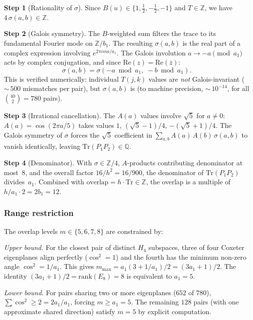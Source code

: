 \documentclass[12pt,a4paper]{article}
\theoremstyle{definition}
\begin{document}
\textbf{Step 1} (Rationality of $\sigma$).  Since $B(u) \in \{1, \tfrac{1}{2}, -\tfrac{1}{2}, -1\}$ and $T \in \mathbb{Z}$, we have $4\,\sigma(a,b) \in \mathbb{Z}$.

\textbf{Step 2} (Galois symmetry).  The $B$-weighted sum filters the trace to its fundamental Fourier mode on $\mathbb{Z}/b_1$.  The resulting $\sigma(a,b)$ is the real part of a complex expression involving $e^{2\pi i m a/a_1}$.  The Galois involution $a \to -a \pmod{a_1}$ acts by complex conjugation, and since $\mathrm{Re}(z) = \mathrm{Re}(\bar{z})$:
\begin{equation}
\sigma(a, b) = \sigma(-a \bmod a_1,\; -b \bmod a_1).
\end{equation}
This is verified numerically: individual $T(j,k)$ values are \emph{not} Galois-invariant (${\sim}\,500$ mismatches per pair), but $\sigma(a,b)$ is (to machine precision, ${\sim}\,10^{-14}$, for all $\binom{40}{2} = 780$ pairs).

\textbf{Step 3} (Irrational cancellation).  The $A(a)$ values involve $\sqrt{5}$ for $a \neq 0$: $A(a) = \cos(2\pi a/5)$ takes values $1$, $(\sqrt{5}-1)/4$, $-(\sqrt{5}+1)/4$.  The Galois symmetry of $\sigma$ forces the $\sqrt{5}$ coefficient in $\sum_{a,b} A(a)\,A(b)\,\sigma(a,b)$ to vanish identically, leaving $\mathrm{Tr}(P_1 P_2) \in \mathbb{Q}$.

\textbf{Step 4} (Denominator).  With $\sigma \in \mathbb{Z}/4$, $A$-products contributing denominator at most~$8$, and the overall factor $16/h^2 = 16/900$, the denominator of $\mathrm{Tr}(P_1 P_2)$ divides~$a_1$.  Combined with $\mathrm{overlap} = h \cdot \mathrm{Tr} \in \mathbb{Z}$, the overlap is a multiple of $h/a_1 \cdot 2 = 2b_1 = 12$.

\subsubsection{Range restriction}
The overlap levels $m \in \{5, 6, 7, 8\}$ are constrained by:

\emph{Upper bound.}  For the closest pair of distinct $H_4$ subspaces, three of four Coxeter eigenplanes align perfectly ($\cos^2 = 1$) and the fourth has the minimum non-zero angle $\cos^2 = 1/a_1$.  This gives $m_{\max} = a_1(3 + 1/a_1)/2 = (3a_1 + 1)/2$.  The identity $(3a_1+1)/2 = \mathrm{rank}(E_8) = 8$ is equivalent to $a_1 = 5$.

\emph{Lower bound.}  For pairs sharing two or more eigenplanes ($652$ of $780$), $\sum\cos^2 \geq 2 = 2a_1/a_1$, forcing $m \geq a_1 = 5$.  The remaining $128$ pairs (with one approximate shared direction) satisfy $m = 5$ by explicit computation.
\end{document}
